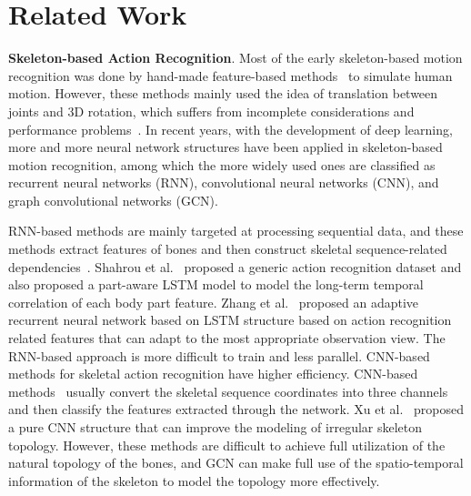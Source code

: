 \documentclass[letterpaper]{article} \usepackage[submission]{aaai23}  \usepackage{times}  \usepackage{helvet}  \usepackage{courier}  \usepackage[hyphens]{url}  \usepackage{graphicx} \urlstyle{rm} \def\UrlFont{\rm}  \usepackage{natbib}  \usepackage{caption} \frenchspacing  \setlength{\pdfpagewidth}{8.5in} \setlength{\pdfpageheight}{11in} \usepackage{algorithm}
\begin{document}
\section{Related Work}






{\bf Skeleton-based Action Recognition}. Most of the early skeleton-based motion recognition was done by hand-made feature-based methods~\cite{2014Human,2015Modeling}  to simulate human motion. However, these methods mainly used the idea of translation between joints and 3D rotation, which suffers from incomplete considerations and performance problems~\cite{2021Learning}. In recent years, with the development of deep learning, more and more neural network structures have been applied in skeleton-based motion recognition, among which the more widely used ones are classified as recurrent neural networks (RNN), convolutional neural networks (CNN), and graph convolutional networks (GCN).


RNN-based methods are mainly targeted at processing sequential data, and these methods extract features of bones and then construct skeletal sequence-related dependencies~\cite{2015Hierarchical,2017Adaptive,2016Spatio,2016NTU,2017View}. Shahrou et al.~\cite{2016NTU} proposed a generic action recognition dataset and also proposed a part-aware LSTM model to model the long-term temporal correlation of each body part feature. Zhang et al.~\cite{2017View} proposed an adaptive recurrent neural network based on LSTM structure based on action recognition related features that can adapt to the most appropriate observation view. The RNN-based approach is more difficult to train and less parallel. CNN-based methods for skeletal action recognition have higher efficiency. CNN-based methods~\cite{2017Two,2017Interpretable,2017A,Liu2017Enhanced,2017Skeleton,2017Skeleton1} usually convert the skeletal sequence coordinates into three channels and then classify the features extracted through the network. Xu et al.~\cite{xu2022topology} proposed a pure CNN structure that can improve the modeling of irregular skeleton topology. However, these methods are difficult to achieve full utilization of the natural topology of the bones, and GCN can make full use of the spatio-temporal information of the skeleton to model the topology more effectively.
\end{document}
